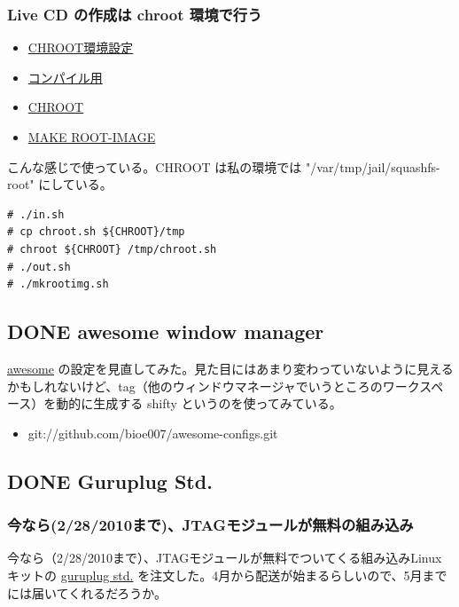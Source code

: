 \documentclass[11pt]{article}
\begin{document}
\subsubsection{Live CD の作成は chroot 環境で行う}
\label{sec:org80e3040}
\begin{itemize}
\item \href{http://github.com/ac1965/config-ac1965/blob/master/etc/skel/script/in.sh}{CHROOT環境設定}
\item \href{http://github.com/ac1965/config-ac1965/blob/master/etc/skel/script/in.sh}{コンパイル用}
\item \href{http://github.com/ac1965/config-ac1965/blob/master/etc/skel/script/chroot.sh}{CHROOT}
\item \href{http://github.com/ac1965/config-ac1965/blob/master/etc/skel/script/mkrootimg.sh}{MAKE ROOT-IMAGE}
\end{itemize}

こんな感じで使っている。CHROOT は私の環境では "/var/tmp/jail/squashfs-root" にしている。
\begin{verbatim}
# ./in.sh
# cp chroot.sh ${CHROOT}/tmp
# chroot ${CHROOT} /tmp/chroot.sh
# ./out.sh
# ./mkrootimg.sh
\end{verbatim}
\subsection{{\bfseries\sffamily DONE} awesome window manager}
\label{sec:orgc4abc8b}
\href{http://awesome.naquadah.org/}{awesome} の設定を見直してみた。見た目にはあまり変わっていないように見えるかもしれないけど、tag（他のウィンドウマネージャでいうところのワークスペース）を動的に生成する shifty というのを使ってみている。

\begin{itemize}
\item git://github.com/bioe007/awesome-configs.git
\end{itemize}
\subsection{{\bfseries\sffamily DONE} Guruplug Std.}
\label{sec:orge6f97ca}
\subsubsection{今なら(2/28/2010まで)、JTAGモジュールが無料の組み込み}
\label{sec:org57b679c}
今なら（2/28/2010まで）、JTAGモジュールが無料でついてくる組み込みLinuxキットの \href{http://www.globalscaletechnologies.com/p-31-guruplug-server-standard.aspx}{guruplug std.} を注文した。4月から配送が始まるらしいので、5月までには届いてくれるだろうか。
\end{document}

